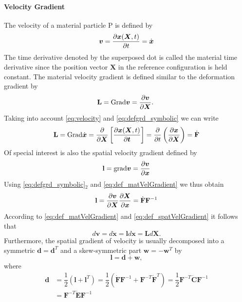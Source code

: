 \paragraph*{Velocity Gradient}
The velocity of a material particle P is defined by
\begin{equation}
    \bm{v} = \pdv{\bm{x}(\bm{X},t)}{t} = \dot{\bm{x}}
    \label{eq:velocity}
\end{equation}
The time derivative denoted by the superposed dot is called the material time derivative since the position vector \(\mathbf{X}\) in the reference configuration is held constant. The material velocity gradient is defined similar to the deformation gradient by
\begin{equation}
    \mathbf{L} = \text{Grad}\bm{v} = \pdv{\bm{v}}{\bm{X}}.\
    \label{eq:def_matVelGradient}
\end{equation}
Taking into account \cref{eq:velocity} and \cref{eq:defgrd_symbolic} we can write 
\begin{equation}
    \mathbf{L} = \text{Grad}\dot{\bm{x}} 
    = \pdv*{\left[\pdv{\bm{x}(\bm{X},t)}{\bm{t}}\right]}{\bm{X}}
    = \pdv*{\left(\pdv{\bm{x}}{\bm{X}}\right)}{t}
    = \dot{\mathbf{F}}
    \label{eq:matVelGradient}
\end{equation}
Of special interest is also the spatial velocity gradient defined by 
\begin{equation}
    \mathbf{l} = \text{grad}\bm{v} = \pdv{\bm{v}}{\bm{x}}
    \label{eq:def_spatVelGradient}
\end{equation}
Using \cref{eq:defgrd_symbolic}\({}_{2}\) and \cref{eq:def_matVelGradient} we thus obtain
\begin{equation}
    \mathbf{l} = \pdv{\bm{v}}{\bm{X}}\pdv{\bm{X}}{\bm{x}}
    = \dot{\mathbf{F}}\mathbf{F}^{-1}
    \label{eq:spatVelGradient}
\end{equation}
According to \cref{eq:def_matVelGradient} and \cref{eq:def_spatVelGradient} it follows that 
\begin{equation}
    d\bm{v} = d\dot{\bm{x}} = \mathbf{l}d\bm{x} = \mathbf{L}d\bm{X}.
\end{equation} 
Furthermore, the spatial gradient of velocity is usually decomposed into a symmetric \(\mathbf{d}=\mathbf{d}^{T}\) and a skew-symmetric part \(\mathbf{w}=-\mathbf{w}^{T}\) by 
\begin{equation}
    \mathbf{l} = \mathbf{d} + \mathbf{w},
    \label{spatial_velocity_gradient}
\end{equation} 
where
\begin{align}
    \nonumber\mathbf{d} 
    &= \dfrac{1}{2}\left(\mathbf{l}+\mathbf{l}^{T}\right) 
    = \dfrac{1}{2}\left(\dot{\mathbf{F}}\mathbf{F}^{-1} +\mathbf{F}^{-T}\dot{\mathbf{F}}^{T}\right)
    = \dfrac{1}{2}\mathbf{F}^{-T}\dot{\mathbf{C}}\mathbf{F}^{-1}\\
    &= \mathbf{F}^{-T}\dot{\mathbf{E}}\mathbf{F}^{-1}
    \label{eq:rate_of_deformation}
\end{align}

